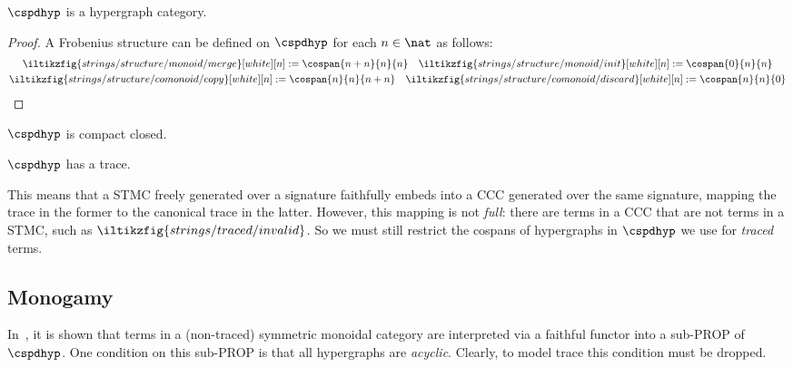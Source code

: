 \begin{proposition}\label{prop:frobenius-map}
    \(\cspdhyp\) is a hypergraph category.
\end{proposition}
\begin{proof}
    A Frobenius structure can be defined on \(\cspdhyp\) for each \(n \in \nat\)
    as follows:
    \begin{gather*}
        \iltikzfig{strings/structure/monoid/merge}[white][n]
        :=
        \cospan{n + n}{n}{n}
        \quad
        \iltikzfig{strings/structure/monoid/init}[white][n]
        :=
        \cospan{0}{n}{n}
        \\
        \iltikzfig{strings/structure/comonoid/copy}[white][n]
        :=
        \cospan{n}{n}{n+n}
        \quad
        \iltikzfig{strings/structure/comonoid/discard}[white][n]
        :=
        \cospan{n}{n}{0}
        \qedhere
    \end{gather*}
\end{proof}

\begin{corollary}
    \(\cspdhyp\) is compact closed.
\end{corollary}

\begin{corollary}
    \(\cspdhyp\) has a trace.
\end{corollary}

This means that a STMC freely generated over a signature faithfully embeds into
a CCC generated over the same signature, mapping the trace in the former to the
canonical trace in the latter.
However, this mapping is not \emph{full}: there are terms in a CCC that are not
terms in a STMC, such as \(\iltikzfig{strings/traced/invalid}\).
So we must still restrict the cospans of hypergraphs in \(\cspdhyp\) we
use for \emph{traced} terms.

\subsection{Monogamy}

In~\cite{bonchi2016rewriting}, it is shown that terms in a (non-traced)
symmetric monoidal category are interpreted via a faithful functor into a
sub-PROP of \(\cspdhyp\).
One condition on this sub-PROP is that all hypergraphs are \emph{acyclic}.
Clearly, to model trace this condition must be dropped.

